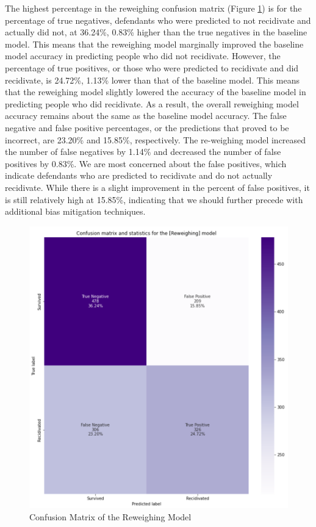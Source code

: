 \documentclass[water,article,submit,moreauthors,pdftex]{mdpi}
\begin{document}
The highest percentage in the reweighing confusion matrix (Figure
\ref{fig:reweighing matrix}) is for the percentage of true negatives,
defendants who were predicted to not recidivate and actually did not, at
36.24\%, 0.83\% higher than the true negatives in the baseline model.
This means that the reweighing model marginally improved the baseline
model accuracy in predicting people who did not recidivate. However, the
percentage of true positives, or those who were predicted to recidivate
and did recidivate, is 24.72\%, 1.13\% lower than that of the baseline
model. This means that the reweighing model slightly lowered the
accuracy of the baseline model in predicting people who did recidivate.
As a result, the overall reweighing model accuracy remains about the
same as the baseline model accuracy. The false negative and false
positive percentages, or the predictions that proved to be incorrect,
are 23.20\% and 15.85\%, respectively. The re-weighing model increased
the number of false negatives by 1.14\% and decreased the number of
false positives by 0.83\%. We are most concerned about the false
positives, which indicate defendants who are predicted to recidivate and
do not actually recidivate. While there is a slight improvement in the
percent of false positives, it is still relatively high at 15.85\%,
indicating that we should further precede with additional bias
mitigation techniques.

\begin{figure}

{\centering \includegraphics[width=1\linewidth]{../images/reweighing_matrix} 

}

\caption{Confusion Matrix of the Reweighing Model}\label{fig:reweighing matrix}
\end{figure}
\end{document}
